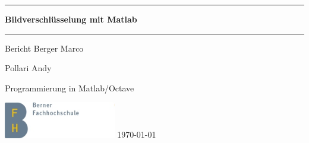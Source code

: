 \documentclass[paper=a4,fontsize=12pt]{scrartcl}
\begin{document}
\thispagestyle{empty}
\newcommand{\Rule}{\rule{\textwidth}{1mm}}
\begin{center}
\Rule\vspace{5mm}
\sffamily\bfseries\Huge
Bildverschlüsselung mit Matlab
\vspace{1mm}\Rule
\vfill
\LARGE Bericht
\vfill
\Large Berger Marco \par
\Large Pollari Andy \par
\Large Programmierung in Matlab/Octave\par
\vfill
\includegraphics[height=16mm]{img/logo_bfh_de.jpg}
\vfill
\today
\end{center}
\newpage
\end{document}
